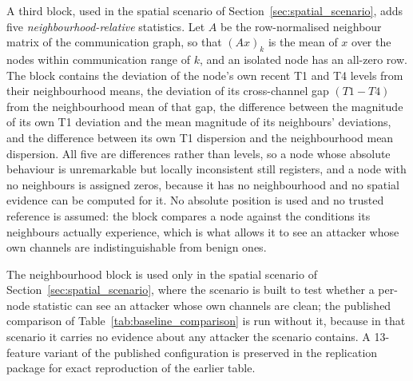 \documentclass[notspecified,article,submit,moreauthors]{Definitions/mdpi}
\begin{document}
A third block, used in the spatial scenario of Section~\ref{sec:spatial_scenario}, adds five \emph{neighbourhood-relative} statistics. Let $A$ be the row-normalised neighbour matrix of the communication graph, so that $(A x)_k$ is the mean of $x$ over the nodes within communication range of $k$, and an isolated node has an all-zero row. The block contains the deviation of the node's own recent T1 and T4 levels from their neighbourhood means, the deviation of its cross-channel gap $(T1-T4)$ from the neighbourhood mean of that gap, the difference between the magnitude of its own T1 deviation and the mean magnitude of its neighbours' deviations, and the difference between its own T1 dispersion and the neighbourhood mean dispersion. All five are differences rather than levels, so a node whose absolute behaviour is unremarkable but locally inconsistent still registers, and a node with no neighbours is assigned zeros, because it has no neighbourhood and no spatial evidence can be computed for it. No absolute position is used and no trusted reference is assumed: the block compares a node against the conditions its neighbours actually experience, which is what allows it to see an attacker whose own channels are indistinguishable from benign ones.

The neighbourhood block is used only in the spatial scenario of Section~\ref{sec:spatial_scenario}, where the scenario is built to test whether a per-node statistic can see an attacker whose own channels are clean; the published comparison of Table~\ref{tab:baseline_comparison} is run without it, because in that scenario it carries no evidence about any attacker the scenario contains. A 13-feature variant of the published configuration is preserved in the replication package for exact reproduction of the earlier table.
\end{document}

